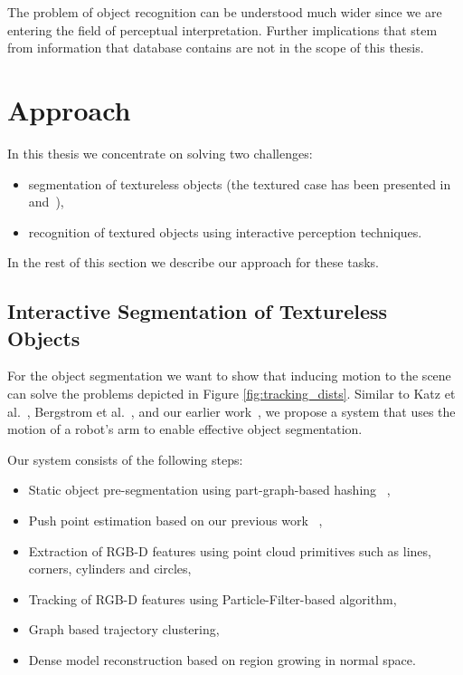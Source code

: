 The problem of object recognition can be understood much wider since we are entering the field of perceptual interpretation. Further implications that stem from information that database contains are not in the scope of this thesis.



\section{Approach} 

In this thesis we concentrate on solving two challenges: 

\begin{itemize} 
\item segmentation of textureless objects (the textured case has been presented in~\cite{bersch12interactive} and~\cite{Katz-WS-MM-ICRA2011}),

\item recognition of textured objects using interactive perception techniques.
\end{itemize} 

In the rest of this section we describe our approach for these tasks.

\subsection{Interactive Segmentation of Textureless Objects} 


For the object segmentation 
 we want to show that inducing motion to the scene can solve the problems depicted in Figure \ref{fig:tracking_dists}. Similar  to Katz  et al.~\cite{Katz-WS-MM-ICRA2011}, Bergstrom et
al.~\cite{bergstrom11icvs}, and our earlier
work~\cite{bersch12interactive}, we propose a system that uses the
motion of a robot's arm to enable effective
object  segmentation.

Our system consists of the following steps:

\begin{itemize} 
\item Static object pre-segmentation using part-graph-based hashing ~\cite{marton12SC},
\item Push point estimation based on our previous work ~\cite{bersch12interactive},
\item Extraction of RGB-D features using point cloud primitives such as lines, corners, cylinders and circles,
\item Tracking of RGB-D features using Particle-Filter-based algorithm,
\item Graph based trajectory clustering,
\item Dense model reconstruction based on region growing in normal space.
\end{itemize} 


